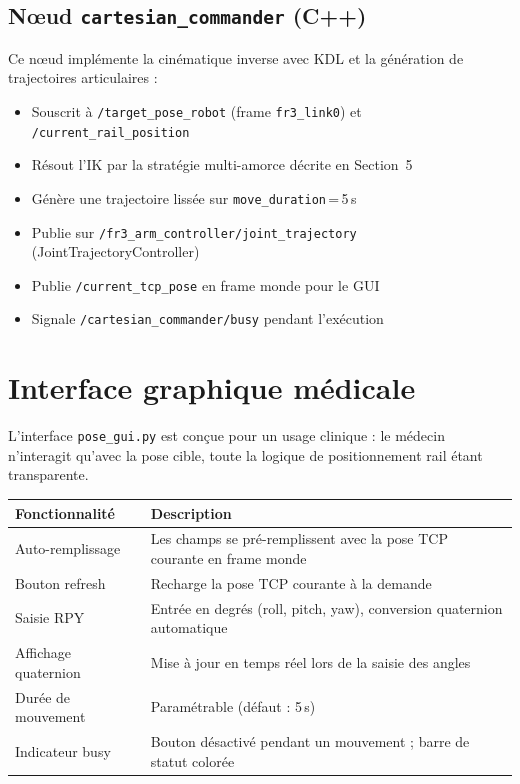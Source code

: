 \documentclass[11pt, a4paper]{article}
\newcommand{\topic}[1]{\texttt{\color{AccentOrange}#1}}
\begin{document}
\subsection{Nœud \texttt{cartesian\_commander} (C++)}

Ce nœud implémente la cinématique inverse avec KDL et la génération de trajectoires articulaires :

\begin{itemize}[leftmargin=1.5em, itemsep=3pt]
  \item Souscrit à \topic{/target\_pose\_robot} (frame \texttt{fr3\_link0}) et \topic{/current\_rail\_position}
  \item Résout l'IK par la stratégie multi-amorce décrite en Section~5
  \item Génère une trajectoire lissée sur \texttt{move\_duration}\,=\,5\,s
  \item Publie sur \topic{/fr3\_arm\_controller/joint\_trajectory} (JointTrajectoryController)
  \item Publie \topic{/current\_tcp\_pose} en frame monde pour le GUI
  \item Signale \topic{/cartesian\_commander/busy} pendant l'exécution
\end{itemize}

\section{Interface graphique médicale}

L'interface \texttt{pose\_gui.py} est conçue pour un usage clinique : le médecin n'interagit qu'avec la pose cible, toute la logique de positionnement rail étant transparente.

\begin{center}
\begin{tabular}{ll}
  \toprule
  \rowcolor{LightBlue}
  \textbf{Fonctionnalité} & \textbf{Description} \\
  \midrule
  Auto-remplissage       & Les champs se pré-remplissent avec la pose TCP courante en frame monde \\
  Bouton refresh         & Recharge la pose TCP courante à la demande \\
  Saisie RPY             & Entrée en degrés (roll, pitch, yaw), conversion quaternion automatique \\
  Affichage quaternion   & Mise à jour en temps réel lors de la saisie des angles \\
  Durée de mouvement     & Paramétrable (défaut : 5\,s) \\
  Indicateur busy        & Bouton désactivé pendant un mouvement ; barre de statut colorée \\
  \bottomrule
\end{tabular}
\end{center}
\end{document}
